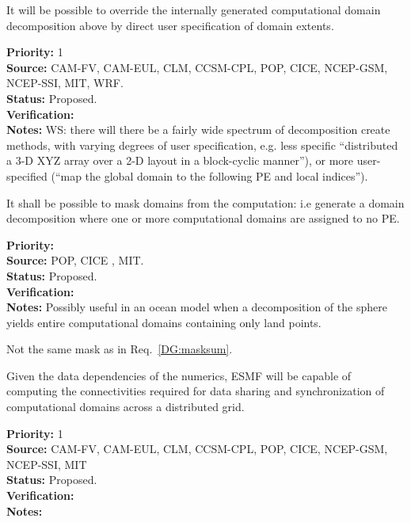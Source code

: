 
It will be possible to override the internally generated computational
domain decomposition above by direct user specification of domain
extents.

\begin{reqlist}
{\bf Priority:} 1 \\ 
{\bf Source:} CAM-FV, CAM-EUL, CLM, CCSM-CPL, POP, CICE, NCEP-GSM, NCEP-SSI, MIT, WRF. \\
{\bf Status:} Proposed. \\
{\bf Verification:} \\
{\bf Notes:} WS:  there will there be a fairly wide spectrum 
of decomposition create methods, with varying degrees of user
specification, e.g. less specific ``distributed a 3-D XYZ array 
over a 2-D layout in a block-cyclic manner''), or more 
user-specified (``map the global domain to the following PE 
and local indices'').

\end{reqlist}

 \label{DG:masklayout}

It shall be possible to mask domains from the computation: i.e
generate a domain decomposition where one or more computational
domains are assigned to no PE.

\begin{reqlist}
{\bf Priority:} \\
{\bf Source:} POP, CICE , MIT. \\
{\bf Status:} Proposed. \\
{\bf Verification:} \\
{\bf Notes:} Possibly useful in an ocean model when a decomposition
  of the sphere yields entire computational domains containing only
  land points.

  Not the same mask as in Req.~\ref{DG:masksum}.
\end{reqlist}


Given the data dependencies of the numerics, ESMF will be capable of
computing the connectivities required for data sharing and
synchronization of computational domains across a distributed grid.


\begin{reqlist}
{\bf Priority:} 1 \\ 
{\bf Source:} CAM-FV, CAM-EUL, CLM, CCSM-CPL, POP, CICE, NCEP-GSM, NCEP-SSI, MIT \\
{\bf Status:} Proposed. \\
{\bf Verification:} \\
{\bf Notes:} 

\end{reqlist}

